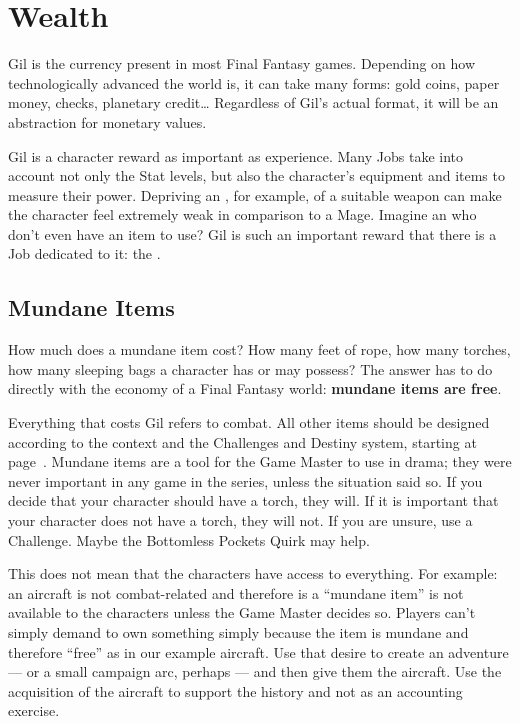 \section{Wealth}

\begin{multicols}{2}\label{sec:inv-wealth}
Gil is the currency present in most Final Fantasy games. Depending on how technologically advanced the world is, it can take many forms: gold coins, paper money, checks, planetary credit\ldots{} Regardless of Gil’s actual format, it will be an abstraction for monetary values.

Gil is a character reward as important as experience. Many Jobs take into account not only the Stat levels, but also the character’s equipment and items to measure their power. Depriving an , for example, of a suitable weapon can make the character feel extremely weak in comparison to a Mage. Imagine an  who don’t even have an item to use? Gil is such an important reward that there is a Job dedicated to it: the .

\subsection{Mundane Items}\label{subsec:inv-mundane}
How much does a mundane item cost? How many feet of rope, how many torches, how many sleeping bags a character has or may possess? The answer has to do directly with the economy of a Final Fantasy world: \textbf{mundane items are free}.

Everything that costs Gil refers to combat. All other items should be designed according to the context and the Challenges and Destiny system, starting at page~\pageref{ch:engine}. Mundane items are a tool for the Game Master to use in drama; they were never important in any game in the series, unless the situation said so. If you decide that your character should have a torch, they will. If it is important that your character does not have a torch, they will not. If you are unsure, use a Challenge. Maybe the Bottomless Pockets Quirk may help.

This does not mean that the characters have access to everything. For example: an aircraft is not combat-related and therefore is a ``mundane item'' is not available to the characters unless the Game Master decides so. Players can’t simply demand to own something simply because the item is mundane and therefore ``free'' as in our example aircraft. Use that desire to create an adventure --- or a small campaign arc, perhaps --- and then give them the aircraft. Use the acquisition of the aircraft to support the history and not as an accounting exercise.


\end{multicols}

